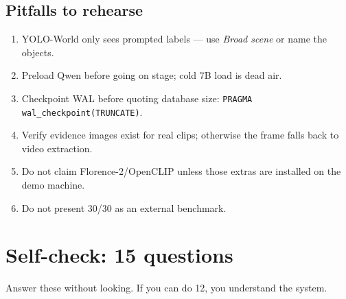 \documentclass[10pt,a4paper]{article}
\newcommand{\code}[1]{\texttt{\small #1}}
\begin{document}
\subsection*{Pitfalls to rehearse}

\begin{enumerate}[leftmargin=1.25em,itemsep=1pt]
  \item YOLO-World only sees prompted labels --- use \emph{Broad scene} or name the objects.
  \item Preload Qwen before going on stage; cold 7B load is dead air.
  \item Checkpoint WAL before quoting database size: \code{PRAGMA wal\_checkpoint(TRUNCATE)}.
  \item Verify evidence images exist for real clips; otherwise the frame falls back to video extraction.
  \item Do not claim Florence-2/OpenCLIP unless those extras are installed on the demo machine.
  \item Do not present 30/30 as an external benchmark.
\end{enumerate}

\section{Self-check: 15 questions}

Answer these without looking. If you can do 12, you understand the system.
\end{document}
